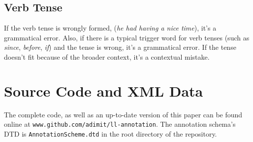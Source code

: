 \documentclass[12pt]{article}
\begin{document}
\subsection{Verb Tense}

If the verb tense is wrongly formed, (\textit{he had having a nice time}), it's
a grammatical error. Also, if there is a typical trigger word for verb tenses
(such as \textit{since}, \textit{before}, \textit{if}) and the tense is wrong,
it's a grammatical error. If the tense doesn't fit because of the broader
context, it's a contextual mistake.

\section{Source Code and XML Data}\label{appendix:github}

The complete code, as well as an up-to-date version of this paper can be found
online at \texttt{www.github.com/adimit/ll-annotation}. The annotation schema's
DTD is \texttt{AnnotationScheme.dtd} in the root directory of the repository.


\end{document}
